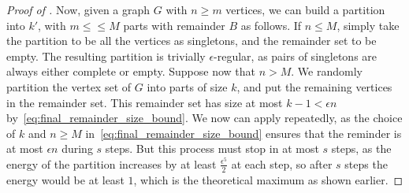 \begin{proof}[Proof of ]
            Now, given a graph $G$ with $n \geq m$ vertices, we can build a partition into $k'$, with $m \leq \leq M$
            parts with remainder $B$ as follows.
            If $n \leq M$, simply take the partition to be all the vertices as singletons, and the remainder set to be empty.
            The resulting partition is trivially $\epsilon$-regular, as pairs of singletons are always either complete or empty.
            Suppose now that $n > M$.
            We randomly partition the vertex set of $G$ into parts of size $k$, and put the remaining vertices in the
            remainder set.
            This remainder set has size at most $k - 1 < \epsilon n$ by~\eqref{eq:final_remainder_size_bound}.
            We now can apply  repeatedly,
            as the choice of $k$ and $n\geq M$ in~\eqref{eq:final_remainder_size_bound} ensures that the reminder is
            at most $\epsilon n$ during $s$ steps.
            But this process must stop in at most $s$ steps, as the energy of the partition increases by at least
            $\frac{\epsilon^5}{2}$ at each step, so after $s$ steps the energy would be at least $1$, which is the theoretical
            maximum as shown earlier.
        \end{proof}